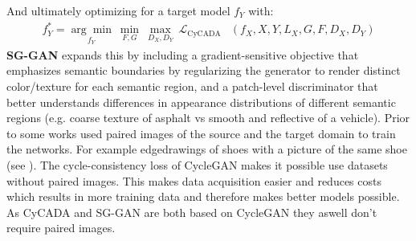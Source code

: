 And ultimately optimizing for a target model $f_Y$ with:
\begin{align}
	f^*_Y = \underset{f_Y}{\arg\min} ~ \underset{F,G}{\min} ~ \underset{D_X, D_Y}{\max} ~ \mathcal{L}_{\text{CyCADA}}&(f_X, X, Y, L_X, G, F, D_X, D_Y)
\end{align}
\textbf{SG-GAN} \cite{DBLP:journals/corr/abs-1801-01726} expands this by including a gradient-sensitive objective that emphasizes semantic boundaries by regularizing the generator to render distinct color/texture for each semantic region, and a patch-level discriminator that better understands differences in appearance distributions of different semantic regions (e.g. coarse texture of asphalt vs smooth and reflective of a vehicle). Prior to \cite{DBLP:journals/corr/ZhuPIE17} some works used paired images of the source and the target domain to train the networks. For example edgedrawings of shoes with a picture of the same shoe (see \cite{DBLP:journals/corr/IsolaZZE16}). The cycle-consistency loss of CycleGAN makes it possible use datasets without paired images. This makes data acquisition easier and reduces costs which results in more training data and therefore makes better models possible. As CyCADA and SG-GAN are both based on CycleGAN they aswell don't require paired images.




